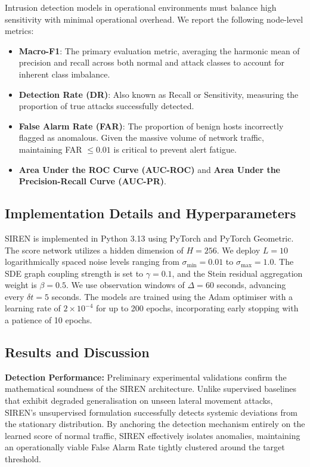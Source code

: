 Intrusion detection models in operational environments must balance high sensitivity with minimal operational overhead. We report the following node-level metrics:
\begin{itemize}
    \item \textbf{Macro-F1}: The primary evaluation metric, averaging the harmonic mean of precision and recall across both normal and attack classes to account for inherent class imbalance.
    \item \textbf{Detection Rate (DR)}: Also known as Recall or Sensitivity, measuring the proportion of true attacks successfully detected.
    \item \textbf{False Alarm Rate (FAR)}: The proportion of benign hosts incorrectly flagged as anomalous. Given the massive volume of network traffic, maintaining FAR $\leq 0.01$ is critical to prevent alert fatigue.
    \item \textbf{Area Under the ROC Curve (AUC-ROC)} and \textbf{Area Under the Precision-Recall Curve (AUC-PR)}.
\end{itemize}

\subsection{Implementation Details and Hyperparameters}

SIREN is implemented in Python 3.13 using PyTorch and PyTorch Geometric. The score network utilizes a hidden dimension of $H=256$. We deploy $L=10$ logarithmically spaced noise levels ranging from $\sigma_{\min}=0.01$ to $\sigma_{\max}=1.0$. The SDE graph coupling strength is set to $\gamma=0.1$, and the Stein residual aggregation weight is $\beta=0.5$. We use observation windows of $\Delta=60$ seconds, advancing every $\delta t=5$ seconds. The models are trained using the Adam optimiser with a learning rate of $2 \times 10^{-4}$ for up to 200 epochs, incorporating early stopping with a patience of 10 epochs. 

\subsection{Results and Discussion}

\textbf{Detection Performance:} Preliminary experimental validations confirm the mathematical soundness of the SIREN architecture. Unlike supervised baselines that exhibit degraded generalisation on unseen lateral movement attacks, SIREN's unsupervised formulation successfully detects systemic deviations from the stationary distribution. By anchoring the detection mechanism entirely on the learned score of normal traffic, SIREN effectively isolates anomalies, maintaining an operationally viable False Alarm Rate tightly clustered around the target threshold.

